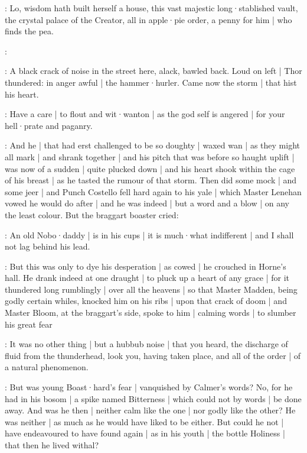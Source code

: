 \stephen:
Lo,
wisdom hath built herself a house,
this vast majestic long·stablished vault,
the crystal palace of the Creator,
all in apple·pie order,
a penny for him |
who finds the pea.

\stephen:




:
A black crack of noise in the street here,
alack,
bawled back.
Loud on left |
Thor thundered:
in anger awful |
the hammer·hurler.
Came now the storm |
that hist his heart.

\lynch:
Have a care |
to flout and wit·wanton |
as the god self is angered |
for your hell·prate and paganry.

:
And he |
that had erst challenged to be so doughty |
waxed wan |
as they might all mark |
and shrank together |
and his pitch that was before so haught uplift |
was now of a sudden |
quite plucked down |
and his heart shook within the cage of his breast |
as he tasted the rumour of that storm.
Then did some mock |
and some jeer |
and Punch Costello fell hard again to his yale |
which Master Lenehan vowed he would do after |
and he was indeed |
but a word and a blow |
on any the least colour.
But the braggart boaster cried:

\stephen:
An old Nobo·daddy |
is in his cups |
it is much·what indifferent |
and I shall not lag behind his lead.

:
But this was only to dye his desperation |
as cowed |
he crouched in Horne's hall.
He drank indeed at one draught |
to pluck up a heart of any grace |
for it thundered long rumblingly |
over all the heavens |
so that Master Madden,
being godly certain whiles,
knocked him on his ribs |
upon that crack of doom |
and Master Bloom,
at the braggart's side,
spoke to him |
calming words |
to slumber his great fear

\Bloom:
It was no other thing |
but a hubbub noise |
that you heard,
the discharge of fluid from the thunderhead,
look you,
having taken place,
and all of the order |
of a natural phenomenon.



:
But was young Boast·hard's fear |
vanquished by Calmer's words?
No,
for he had in his bosom |
a spike named Bitterness |
which could not by words |
be done away.
And was he then |
neither calm like the one |
nor godly like the other?
He was neither |
as much as he would have liked to be either.
But could he not |
have endeavoured to have found again |
as in his youth |
the bottle Holiness |
that then he lived withal?

